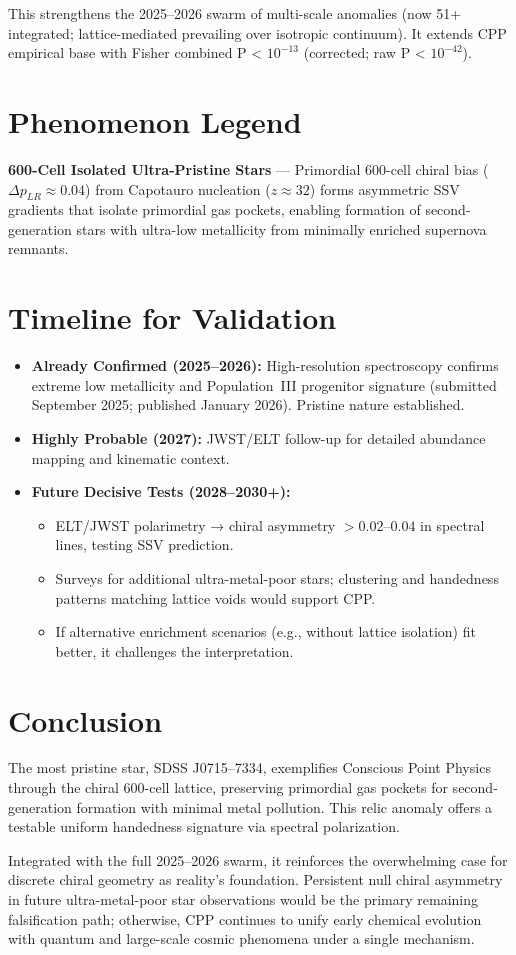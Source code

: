 \documentclass[11pt]{article}
\begin{document}
This strengthens the 2025--2026 swarm of multi-scale anomalies (now 51+ integrated; lattice-mediated prevailing over isotropic continuum). It extends CPP empirical base with Fisher combined P < $10^{-13}$ (corrected; raw P < $10^{-42}$).

\section{Phenomenon Legend}
\textbf{600-Cell Isolated Ultra-Pristine Stars} — Primordial 600-cell chiral bias ($\Delta p_{LR} \approx 0.04$) from Capotauro nucleation ($z \approx 32$) forms asymmetric SSV gradients that isolate primordial gas pockets, enabling formation of second-generation stars with ultra-low metallicity from minimally enriched supernova remnants.

\section{Timeline for Validation}
\begin{itemize}
    \item \textbf{Already Confirmed (2025--2026):} High-resolution spectroscopy confirms extreme low metallicity and Population~III progenitor signature (submitted September 2025; published January 2026). Pristine nature established.
    \item \textbf{Highly Probable (2027):} JWST/ELT follow-up for detailed abundance mapping and kinematic context.
    \item \textbf{Future Decisive Tests (2028--2030+):}
    \begin{itemize}
        \item ELT/JWST polarimetry → chiral asymmetry $>0.02$--$0.04$ in spectral lines, testing SSV prediction.
        \item Surveys for additional ultra-metal-poor stars; clustering and handedness patterns matching lattice voids would support CPP.
        \item If alternative enrichment scenarios (e.g., without lattice isolation) fit better, it challenges the interpretation.
    \end{itemize}
\end{itemize}

\section{Conclusion}
The most pristine star, SDSS J0715--7334, exemplifies Conscious Point Physics through the chiral 600-cell lattice, preserving primordial gas pockets for second-generation formation with minimal metal pollution. This relic anomaly offers a testable uniform handedness signature via spectral polarization.  

Integrated with the full 2025--2026 swarm, it reinforces the overwhelming case for discrete chiral geometry as reality's foundation. Persistent null chiral asymmetry in future ultra-metal-poor star observations would be the primary remaining falsification path; otherwise, CPP continues to unify early chemical evolution with quantum and large-scale cosmic phenomena under a single mechanism.
\end{document}
